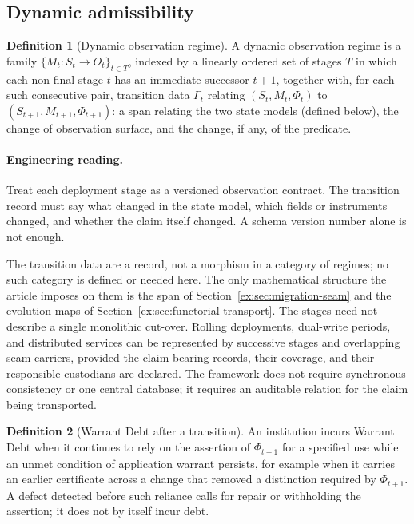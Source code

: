 \documentclass[11pt]{article}
\theoremstyle{definition}
\newtheorem{definition}{Definition}[section]
\begin{document}
\subsection{Dynamic admissibility}\label{ex:sec:dynamic}

\begin{definition}[Dynamic observation regime]
A dynamic observation regime is a family $\{M_t:S_t\to O_t\}_{t \in T}$, indexed by a linearly ordered set of stages $T$ in which each non-final stage $t$ has an immediate successor $t+1$, together with, for each such consecutive pair, transition data $\Gamma_t$ relating $(S_t,M_t,\Phi_t)$ to $(S_{t+1},M_{t+1},\Phi_{t+1})$: a span relating the two state models (defined below), the change of observation surface, and the change, if any, of the predicate.
\end{definition}

\paragraph{Engineering reading.} Treat each deployment stage as a versioned observation contract. The transition record must say what changed in the state model, which fields or instruments changed, and whether the claim itself changed. A schema version number alone is not enough.

The transition data are a record, not a morphism in a category of regimes; no such category is defined or needed here. The only mathematical structure the article imposes on them is the span of Section~\ref{ex:sec:migration-seam} and the evolution maps of Section~\ref{ex:sec:functorial-transport}. The stages need not describe a single monolithic cut-over. Rolling deployments, dual-write periods, and distributed services can be represented by successive stages and overlapping seam carriers, provided the claim-bearing records, their coverage, and their responsible custodians are declared. The framework does not require synchronous consistency or one central database; it requires an auditable relation for the claim being transported.

\begin{definition}[Warrant Debt after a transition]\label{ex:def:dynamic-debt}
An institution incurs Warrant Debt when it continues to rely on the assertion of $\Phi_{t+1}$ for a specified use while an unmet condition of application warrant persists, for example when it carries an earlier certificate across a change that removed a distinction required by $\Phi_{t+1}$. A defect detected before such reliance calls for repair or withholding the assertion; it does not by itself incur debt.
\end{definition}
\end{document}
